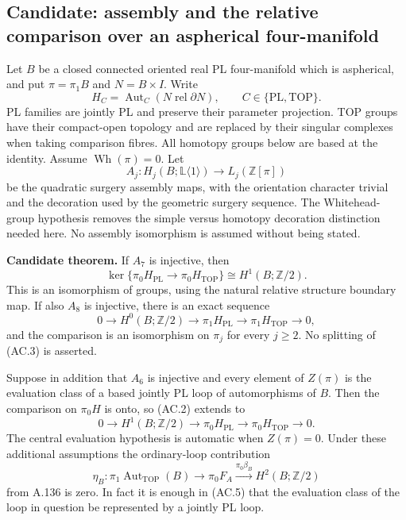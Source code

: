 \subsection*{Candidate: assembly and the relative comparison over an aspherical four-manifold}

Let $B$ be a closed connected oriented real PL four-manifold which is
aspherical, and put $\pi=\pi_1B$ and $N=B\times I$.
Write
\[
 H_C=\operatorname{Aut}_C(N\operatorname{ rel}\partial N),
 \qquad C\in\{\mathrm{PL},\mathrm{TOP}\}.
\]
PL families are jointly PL and preserve their parameter projection.
TOP groups have their compact-open topology and are replaced by their
singular complexes when taking comparison fibres. All homotopy groups
below are based at the identity. Assume $\operatorname{Wh}(\pi)=0$.
Let
\[
 A_j:H_j(B;\mathbb L\langle1\rangle)
                 \longrightarrow L_j(\mathbb Z[\pi])                 \tag{AC.1}
\]
be the quadratic surgery assembly maps, with the orientation character
trivial and the decoration used by the geometric surgery sequence.
The Whitehead-group hypothesis removes the simple versus homotopy
decoration distinction needed here. No assembly isomorphism is assumed
without being stated.

\textbf{Candidate theorem.}\quad
If $A_7$ is injective, then
\[
 \ker\{\pi_0H_{\mathrm{PL}}\longrightarrow\pi_0H_{\mathrm{TOP}}\}
                      \cong H^1(B;\mathbb Z/2).                     \tag{AC.2}
\]
This is an isomorphism of groups, using the natural relative structure
boundary map. If also $A_8$ is injective, there is an exact sequence
\[
 0\longrightarrow H^0(B;\mathbb Z/2)
  \longrightarrow\pi_1H_{\mathrm{PL}}
  \longrightarrow\pi_1H_{\mathrm{TOP}}\longrightarrow0,             \tag{AC.3}
\]
and the comparison is an isomorphism on $\pi_j$ for every $j\ge2$.
No splitting of (AC.3) is asserted.

Suppose in addition that $A_6$ is injective and every element of
$Z(\pi)$ is the evaluation class of a based jointly PL loop of
automorphisms of $B$. Then the comparison on $\pi_0H$ is onto, so
(AC.2) extends to
\[
 0\longrightarrow H^1(B;\mathbb Z/2)
  \longrightarrow\pi_0H_{\mathrm{PL}}
  \longrightarrow\pi_0H_{\mathrm{TOP}}\longrightarrow0.             \tag{AC.4}
\]
The central evaluation hypothesis is automatic when $Z(\pi)=0$.
Under these additional assumptions the ordinary-loop contribution
\[
 \eta_B:\pi_1\operatorname{Aut}_{\mathrm{TOP}}(B)
       \longrightarrow\pi_0F_A
       \xrightarrow{\pi_0\beta_B}H^2(B;\mathbb Z/2)                 \tag{AC.5}
\]
from A.136 is zero. In fact it is enough in (AC.5) that the evaluation
class of the loop in question be represented by a jointly PL loop.


